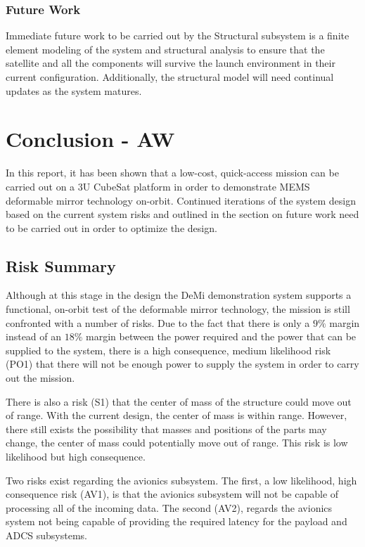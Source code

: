 \documentclass[12pt]{article}
\begin{document}
\subsubsection{Future Work}
Immediate future work to be carried out by the Structural subsystem is a finite element modeling of the system and structural analysis to ensure that the satellite and all the components will survive the launch environment in their current configuration. Additionally, the structural model will need continual updates as the system matures.

\section{Conclusion - AW}
In this report, it has been shown that a low-cost, quick-access mission can be carried out on a 3U CubeSat platform in order to demonstrate MEMS deformable mirror technology on-orbit.  Continued iterations of the system design based on the current system risks and outlined in the section on future work need to be carried out in order to optimize the design.

		\subsection{Risk Summary}
Although at this stage in the design the DeMi demonstration system supports a functional, on-orbit test of the deformable mirror technology, the mission is still confronted with a number of risks.  Due to the fact that there is only a $9\%$ margin instead of an $18\%$ margin between the power required and the power that can be supplied to the system, there is a high consequence, medium likelihood risk (PO1) that there will not be enough power to supply the system in order to carry out the mission.

There is also a risk (S1) that the center of mass of the structure could move out of range.  With the current design, the center of mass is within range.  However, there still exists the possibility that masses and positions of the parts may change, the center of mass could potentially move out of range.  This risk is low likelihood but high consequence.

Two risks exist regarding the avionics subsystem.  The first, a low likelihood, high consequence risk (AV1), is that the avionics subsystem will not be capable of processing all of the incoming data.  The second (AV2), regards the avionics system not being capable of providing the required latency for the payload and ADCS subsystems. 
\end{document}

